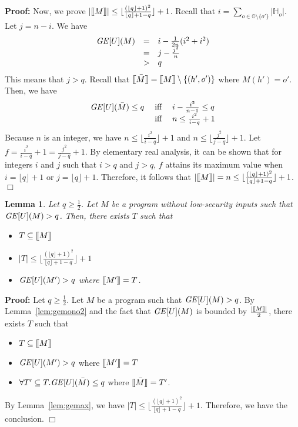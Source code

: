 \documentclass{llncs}
\newtheorem{lemma}[theorem]{Lemma}
\newenvironment{proof}{\noindent\rm{\bf Proof:}}{\hbox{$\Box$}\vspace*{0.2\baselineskip}}
\newcommand{\aset}[1]{\{{#1}\}}
\newcommand{\sembrack}[1]{[\hspace*{-1.2pt}[#1]\hspace*{-1.2pt}]}
\begin{document}
\begin{proof}
Now, we prove $|\sembrack{M}|\le\lfloor \frac{(\lfloor q\rfloor
  +1)^2}{\lfloor q\rfloor +1 -q}\rfloor +1$.  Recall that
$i=\sum_{o\in\mathbb{O}\setminus\aset{o'}}|\mathbb{H}_o|$.  Let
$j=n-i$.  We have
\[
\begin{array}{rcl}
{\it GE}[U](M)&=&i-\frac{1}{2n}(i^2+i^2)\\
&=&j-\frac{j^2}{n}\\
&>&q
\end{array}
\]
This means that $j>q$.  Recall that
$\sembrack{\bar{M}}=\sembrack{M}\setminus \aset{(h',o')}$ where
$M(h')=o'$.  Then, we have
\[
\begin{array}{rcl}
{\it GE}[U](\bar{M})\le q\;&\textrm{iff}&\;i-\frac{i^2}{n-1}\le q\\
&\textrm{iff}&\;n\le\frac{i^2}{i-q}+1
\end{array}
\]
Because $n$ is an integer, we have $n\le\lfloor\frac{i^2}{i-q}\rfloor
+1$ and $n\le\lfloor\frac{j^2}{j-q}\rfloor +1$.  Let
$f=\frac{i^2}{i-q}+1=\frac{j^2}{j-q}+1$.  By elementary real analysis,
it can be shown that for integers $i$ and $j$ such that $i>q$ and
$j>q$, $f$ attains its maximum value when $i=\lfloor q\rfloor +1$ or
$j=\lfloor q\rfloor +1$.  Therefore, it follows that
$|\sembrack{M}|=n\le\lfloor\frac{(\lfloor q\rfloor +1)^2}{\lfloor
  q\rfloor +1 -q}\rfloor +1$.
\end{proof}

\begin{lemma}
  Let $q\ge\frac{1}{2}$.  Let $M$ be a program without low-security
  inputs such that ${\it GE}[U](M)>q$.  Then, there exists $T$ such
  that
\begin{itemize}
\item $T\subseteq \sembrack{M}$
\item $|T|\le \lfloor\frac{(\lfloor q\rfloor +1)^2}{\lfloor q\rfloor
    +1 -q} \rfloor +1$
\item ${\it GE}[U](M')>q$ where $\sembrack{M'}=T$.
\end{itemize}
\label{lem:gemax3}
\end{lemma}
\begin{proof}
  Let $q\ge\frac{1}{2}$.  Let $M$ be a program such that ${\it
    GE}[U](M)>q$.  By Lemma~\ref{lem:gemono2} and the fact that ${\it
    GE}[U](M)$ is bounded by $\frac{|\sembrack{M}|}{2}$, there exists
  $T$ such that
\begin{itemize}
\item $T\subseteq \sembrack{M}$
\item ${\it GE}[U](M')>q$ where $\sembrack{M'}=T$
\item $\forall T'\subseteq T. {\it GE}[U](\bar{M})\le q$ where
  $\sembrack{\bar{M}}=T'$.
\end{itemize}
By Lemma~\ref{lem:gemax}, we have $|T|\le \lfloor\frac{(\lfloor
  q\rfloor +1)^2}{\lfloor q\rfloor +1 -q} \rfloor +1$.  Therefore, we
have the conclusion.
\end{proof}
\end{document}

